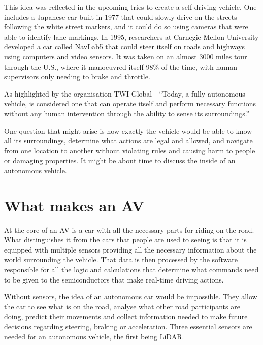 This idea was reflected in the upcoming tries to create a self-driving vehicle. One includes a Japanese car built in 1977 that could slowly drive on the streets following the white street markers, and it could do so using cameras that were able to identify lane markings.
In 1995, researchers at Carnegie Mellon University developed a car called NavLab5 \cite{528266} that could steer itself on roads and highways using computers and video sensors. It was taken on an almost 3000 miles tour through the U.S., where it manoeuvred itself 98\% of the time, with human supervisors only needing to brake and throttle.

As highlighted by the organisation TWI Global - ``Today, a fully autonomous vehicle, is considered one that can operate itself and perform necessary functions without any human intervention through the ability to sense its surroundings.'' \cite{twi} 

One question that might arise is how exactly the vehicle would be able to know all its surroundings, determine what actions are legal and allowed, and navigate from one location to another without violating rules and causing harm to people or damaging properties. It might be about time to discuss the inside of an autonomous vehicle.

\section{What makes an AV} \label{sect-2.2}
At the core of an AV is a car with all the necessary parts for riding on the road. What distinguishes it from the cars that people are used to seeing is that it is equipped with multiple sensors providing all the necessary information about the world surrounding the vehicle. That data is then processed by the software responsible for all the logic and calculations that determine what commands need to be given to the semiconductors that make real-time driving actions.

Without sensors, the idea of an autonomous car would be impossible. They allow the car to see what is on the road, analyse what other road participants are doing, predict their movements and collect information needed to make future decisions regarding steering, braking or acceleration. Three essential sensors are needed for an autonomous vehicle\cite{8612054}, the first being LiDAR.

